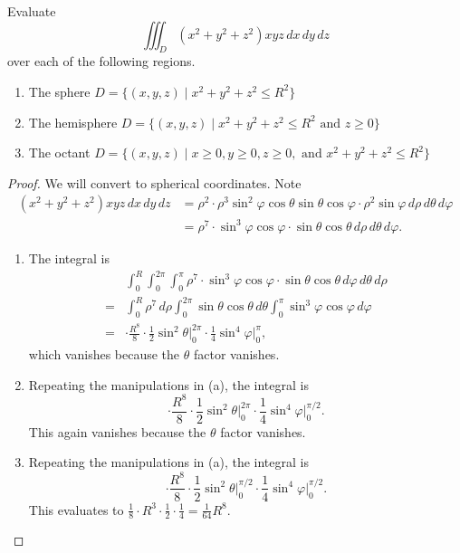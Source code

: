 \documentclass[openany]{book}
\begin{document}
\begin{prob}[24]
    Evaluate
    \[
    \iiint_{D} (x^2 + y^2 + z^2) xyz \, dx \, dy \, dz
    \]
    over each of the following regions.

    \begin{enumerate}
        \item[(a)] The sphere \( D = \{(x, y, z) \mid x^2 + y^2 + z^2 \leq R^2\} \)
        \item[(b)] The hemisphere \( D = \{(x, y, z) \mid x^2 + y^2 + z^2 \leq R^2 \text{ and } z \geq 0\} \)
        \item[(c)] The octant \( D = \{(x, y, z) \mid x \geq 0, y \geq 0, z \geq 0, \text{ and } x^2 + y^2 + z^2 \leq R^2\} \)
    \end{enumerate}
\end{prob}
\begin{proof}
    We will convert to spherical coordinates. Note
    \begin{align*}
        \left(x^2+y^2+z^2\right)xyz\,dx\,dy\,dz &= \rho^2\cdot\rho^3\sin^2\varphi\cos\theta\sin\theta\cos\varphi\cdot\rho^2\sin\varphi\,d\rho\,d\theta\,d\varphi \\
        &= \rho^7\cdot\sin^3\varphi\cos\varphi\cdot\sin\theta\cos\theta\,d\rho\,d\theta\,d\varphi.
    \end{align*}
    \begin{enumerate}
        \item[(a)] The integral is
        \begin{align*}
            & \int_0^R\int_0^{2\pi}\int_0^\pi\rho^7\cdot\sin^3\varphi\cos\varphi\cdot\sin\theta\cos\theta\,d\varphi\,d\theta\,d\rho \\
            ={}& \int_0^R\rho^7\,d\rho\int_0^{2\pi}\sin\theta\cos\theta\,d\theta\int_0^\pi\sin^3\varphi\cos\varphi\,d\varphi \\
            ={}& \cdot\frac{R^8}8\cdot\frac12\sin^2\theta\bigg|_0^{2\pi}\cdot\frac14\sin^4\varphi\bigg|_0^\pi,
        \end{align*}
        which vanishes because the $\theta$ factor vanishes.
        \item[(b)] Repeating the manipulations in (a), the integral is
        \[\cdot\frac{R^8}8\cdot\frac12\sin^2\theta\bigg|_0^{2\pi}\cdot\frac14\sin^4\varphi\bigg|_0^{\pi/2}.\]
        This again vanishes because the $\theta$ factor vanishes.
        \item[(c)] Repeating the manipulations in (a), the integral is
        \[\cdot\frac{R^8}8\cdot\frac12\sin^2\theta\bigg|_0^{\pi/2}\cdot\frac14\sin^4\varphi\bigg|_0^{\pi/2}.\]
        This evaluates to $\frac18\cdot R^3\cdot\frac12\cdot\frac14=\frac1{64}R^8$.
        \qedhere
    \end{enumerate}
\end{proof}
\end{document}
